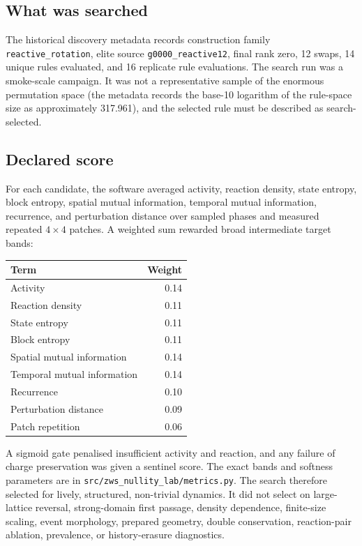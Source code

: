 \documentclass[11pt,a4paper]{article}
\newcommand{\code}[1]{\texttt{#1}}
\begin{document}
\subsection{What was searched}
The historical discovery metadata records construction family \code{reactive\_rotation}, elite source \code{g0000\_reactive12}, final rank zero, 12 swaps, 14 unique rules evaluated, and 16 replicate rule evaluations. The search run was a smoke-scale campaign. It was not a representative sample of the enormous permutation space (the metadata records the base-10 logarithm of the rule-space size as approximately 317.961), and the selected rule must be described as search-selected.

\subsection{Declared score}
For each candidate, the software averaged activity, reaction density, state entropy, block entropy, spatial mutual information, temporal mutual information, recurrence, and perturbation distance over sampled phases and measured repeated $4\times4$ patches. A weighted sum rewarded broad intermediate target bands:
\begin{center}
\begin{tabular}{@{}lr@{}}
\toprule
Term & Weight \\
\midrule
Activity & 0.14 \\
Reaction density & 0.11 \\
State entropy & 0.11 \\
Block entropy & 0.11 \\
Spatial mutual information & 0.14 \\
Temporal mutual information & 0.14 \\
Recurrence & 0.10 \\
Perturbation distance & 0.09 \\
Patch repetition & 0.06 \\
\bottomrule
\end{tabular}
\end{center}
A sigmoid gate penalised insufficient activity and reaction, and any failure of charge preservation was given a sentinel score. The exact bands and softness parameters are in \code{src/\allowbreak zws\_nullity\_lab/\allowbreak metrics.py}. The search therefore selected for lively, structured, non-trivial dynamics. It did not select on large-lattice reversal, strong-domain first passage, density dependence, finite-size scaling, event morphology, prepared geometry, double conservation, reaction-pair ablation, prevalence, or history-erasure diagnostics.
\end{document}
